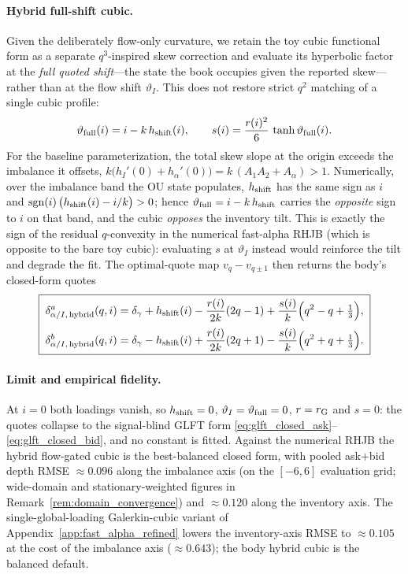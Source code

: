 \documentclass[11pt,a4paper]{article}
\theoremstyle{plain}
\theoremstyle{definition}
\begin{document}
\paragraph{Hybrid full-shift cubic.}
Given the deliberately flow-only curvature, we retain the toy cubic functional
form as a separate \(q^3\)-inspired skew correction and evaluate its
hyperbolic factor at the \emph{full quoted shift}---the state the book
occupies given the reported skew---rather than at the flow shift
\(\vartheta_I\).  This does not restore strict \(q^2\) matching of a single
cubic profile:
\begin{equation}
\vartheta_{\rm full}(i)=i-k\,h_{\rm shift}(i),\qquad s(i)=\frac{r(i)^2}{6}\,\tanh\vartheta_{\rm full}(i).
\label{eq:fa_selfcons_cubic}
\end{equation}
For the baseline parameterization, the total skew slope at the origin exceeds the imbalance it offsets, \(k\bigl(h_I'(0)+h_\alpha'(0)\bigr)=k\,(A_1A_2+A_\alpha)>1\). Numerically, over the imbalance band the OU state populates, \(h_{\rm shift}\) has the same sign as \(i\) and \(\operatorname{sgn}(i)\,\bigl(h_{\rm shift}(i)-i/k\bigr)>0\); hence \(\vartheta_{\rm full}=i-k\,h_{\rm shift}\) carries the \emph{opposite} sign to \(i\) on that band, and the cubic \emph{opposes} the inventory tilt. This is exactly the sign of the residual \(q\)-convexity in the numerical fast-alpha RHJB (which is opposite to the bare toy cubic): evaluating \(s\) at \(\vartheta_I\) instead would reinforce the tilt and degrade the fit. The optimal-quote map \(v_q-v_{q\pm1}\) then returns the body's closed-form quotes
\begin{equation}
\boxed{\;
\begin{aligned}
\delta_{\alpha/I,\,\text{hybrid}}^a(q,i)&=\delta_\gamma+h_{\rm shift}(i)-\frac{r(i)}{2k}(2q-1)+\frac{s(i)}{k}\Bigl(q^2-q+\tfrac13\Bigr),\\[2pt]
\delta_{\alpha/I,\,\text{hybrid}}^b(q,i)&=\delta_\gamma-h_{\rm shift}(i)+\frac{r(i)}{2k}(2q+1)-\frac{s(i)}{k}\Bigl(q^2+q+\tfrac13\Bigr).
\end{aligned}\;}
\label{eq:fast_alpha_selfconsistent_quotes}
\end{equation}

\paragraph{Limit and empirical fidelity.}
At \(i=0\) both loadings vanish, so \(h_{\rm shift}=0\), \(\vartheta_I=\vartheta_{\rm full}=0\), \(r=r_{\rm G}\) and \(s=0\): the quotes collapse to the signal-blind GLFT form \eqref{eq:glft_closed_ask}--\eqref{eq:glft_closed_bid}, and no constant is fitted. Against the numerical RHJB the hybrid flow-gated cubic is the best-balanced closed form, with pooled ask\(+\)bid depth RMSE \(\approx0.096\) along the imbalance axis (on the \([-6,6]\) evaluation grid; wide-domain and stationary-weighted figures in Remark~\ref{rem:domain_convergence}) and \(\approx0.120\) along the inventory axis. The single-global-loading Galerkin-cubic variant of Appendix~\ref{app:fast_alpha_refined} lowers the inventory-axis RMSE to \(\approx0.105\) at the cost of the imbalance axis (\(\approx0.643\)); the body hybrid cubic is the balanced default.
\end{document}
